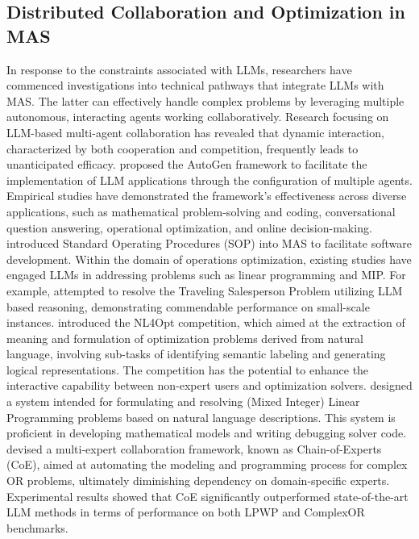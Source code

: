 \documentclass[preprint,12pt]{elsarticle}
\begin{document}
\subsection{Distributed Collaboration and Optimization in MAS}

In response to the constraints associated with LLMs, researchers have commenced investigations into technical pathways that integrate LLMs with MAS. The latter can effectively handle complex problems by leveraging multiple autonomous, interacting agents working collaboratively. Research focusing on LLM-based multi-agent collaboration has revealed that dynamic interaction, characterized by both cooperation and competition, frequently leads to unanticipated efficacy. \citet{wuAutoGenEnablingNextGen2024} proposed the AutoGen framework to facilitate the implementation of LLM applications through the configuration of multiple agents. Empirical studies have demonstrated the framework's effectiveness across diverse applications, such as mathematical problem-solving and coding, conversational question answering, operational optimization, and online decision-making. \citet{hongMetaGPTMetaProgramming2023a} introduced Standard Operating Procedures (SOP) into MAS to facilitate software development. Within the domain of operations optimization, existing studies have engaged LLMs in addressing problems such as linear programming and MIP. For example, \citet{zhangNeuralTSPSolver2023} attempted to resolve the Traveling Salesperson Problem utilizing LLM based reasoning, demonstrating commendable performance on small-scale instances. \citet{ramamonjisonNL4OptCompetitionFormulating2023} introduced the NL4Opt competition, which aimed at the extraction of meaning and formulation of optimization problems derived from natural language, involving sub-tasks of identifying semantic labeling and generating logical representations. The competition has the potential to enhance the interactive capability between non-expert users and optimization solvers. \citet{ahmaditeshniziOptiMUSScalableOptimization2024b} designed a system intended for formulating and resolving (Mixed Integer) Linear Programming problems based on natural language descriptions. This system is proficient in developing mathematical models and writing debugging solver code. \citet{xiaoChainofExpertsWhenLLMs2023} devised a multi-expert collaboration framework, known as Chain-of-Experts (CoE), aimed at automating the modeling and programming process for complex OR problems, ultimately diminishing dependency on domain-specific experts. Experimental results showed that CoE significantly outperformed state-of-the-art LLM methods in terms of performance on both LPWP and ComplexOR benchmarks.
\end{document}
